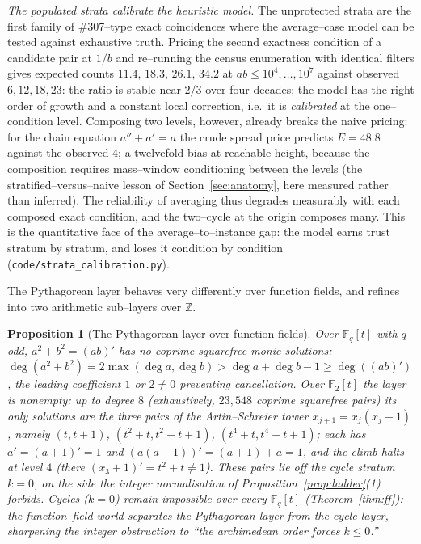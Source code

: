 \documentclass[11pt]{article}
\newtheorem{proposition}[theorem]{Proposition}
\theoremstyle{definition}
\begin{document}
\emph{The populated strata calibrate the heuristic model.} The unprotected strata are the first family of \#307--type exact coincidences where the
average--case model can be tested against exhaustive truth. Pricing the second exactness condition
of a candidate pair at $1/b$ and re--running the census enumeration with identical filters gives
expected counts $11.4,\,18.3,\,26.1,\,34.2$ at $ab\le10^4,\dots,10^7$ against observed
$6,12,18,23$: the ratio is stable near $2/3$ over four decades; the model has the right order of
growth and a constant local correction, i.e.\ it is \emph{calibrated} at the one--condition level.
Composing two levels, however, already breaks the naive pricing: for the chain equation $a''+a'=a$
the crude spread price predicts $E=48.8$ against the observed $4$; a twelvefold bias at
reachable height, because the composition requires mass--window conditioning between the levels
(the stratified--versus--naive lesson of Section~\ref{sec:anatomy}, here measured rather than
inferred). The reliability of averaging thus degrades measurably with each composed exact
condition, and the two--cycle at the origin composes many. This is the quantitative face of the
average--to--instance gap: the model earns trust stratum by stratum, and loses it condition by
condition (\texttt{code/strata\_calibration.py}).


The Pythagorean layer behaves very differently over function fields, and refines into two arithmetic
sub--layers over $\mathbb{Z}$.

\begin{proposition}[The Pythagorean layer over function fields]\label{prop:ff-pyth}
Over $\mathbb{F}_q[t]$ with $q$ odd, $a^2+b^2=(ab)'$ has no coprime squarefree monic solutions:
$\deg(a^2+b^2)=2\max(\deg a,\deg b)>\deg a+\deg b-1\ge\deg((ab)')$, the leading coefficient $1$ or
$2\ne0$ preventing cancellation. Over $\mathbb{F}_2[t]$ the layer is nonempty: up to degree $8$
(exhaustively, $23{,}548$ coprime squarefree pairs) its only solutions are the three pairs of the
Artin--Schreier tower $x_{j+1}=x_j(x_j+1)$, namely $(t,t+1)$, $(t^2+t,t^2+t+1)$, $(t^4+t,t^4+t+1)$;
each has $a'=(a+1)'=1$ and $(a(a+1))'=(a+1)+a=1$, and the climb halts at level $4$ (there
$(x_3+1)'=t^2+t\ne1$). These pairs lie off the cycle stratum $k=0$, on the side the integer
normalisation of Proposition~\ref{prop:ladder}(1) forbids. Cycles ($k=0$) remain impossible over every
$\mathbb{F}_q[t]$ (Theorem~\ref{thm:ff}): the function--field world separates the Pythagorean layer
from the cycle layer, sharpening the integer obstruction to ``the archimedean order forces $k\le0$.''
\end{proposition}
\end{document}
